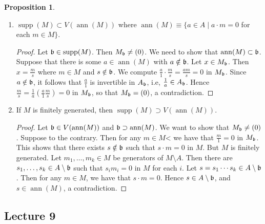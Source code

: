 \documentclass[10pt,letterpaper,cm]{nupset}
\theoremstyle{definition}
\theoremstyle{theorem}
\newtheorem{prop}[definition]{Proposition}
\theoremstyle{remark}
\newcommand{\1}{\mathbf{1}}
\newcommand{\0}{\vec 0}
\DeclareMathOperator{\ann}{ann}
\DeclareMathOperator{\supp}{supp}
\begin{document}
\begin{prop} $ $
\begin{enumerate}
\item $\supp(M) \subset V(\ann(M))$ where $\ann(M) \equiv \{a\in A \mid a\cdot m = 0$ for each $m\in M\}$. 
\begin{proof}
Let $\frak{b} \in \supp(M)$. Then $M_{\frak{b}} \ne (0)$. We need to show that $\ann(M) \subset \frak{b}$.  Suppose that there is some $a\in \ann(M)$ with $a\notin \frak{b}$. Let $x\in M_{\frak{b}}$. Then $x= \frac{m}{s}$ where $m\in M$ and $s\notin \frak{b}$. We compute $\frac{a}{1} \cdot \frac{m}{s} = \frac{am}{s} = 0$ in $M_{\frak{b}}$. Since $a\notin \frak{b}$, it follows that $\frac{a}{1}$ is invertible in $A_{\frak{b}}$, i.e, $\frac{1}{a} \in A_{\frak{b}}$. Hence $\frac{m}{s} = \frac{1}{a}\left(\frac{a}{1}\frac{m}{s}\right) = 0$ in $M_{\frak{b}}$, so that $M_{\frak{b}} = \left(0\right)$, a contradiction.  
\end{proof}
\item If $M$ is finitely generated, then  $\supp(M) \supset V(\ann(M))$.
\begin{proof}
Let $\frak{b} \in V(\ann(M))$ and $\frak{b} \supset \ann(M)$. We want to show that $M_{\frak{b}} \ne (0)$. Suppose to the contrary. Then for any $m\in M$< we have that $\frac{m}{1} =0$ in $M_{\frak{b}}$. This shows that there exists $s\notin \frak{b}$ such that $s\cdot m = 0$ in $M$. But $M$ is finitely generated. Let $m_1, \ldots, m_k \in M$ be generators of $M \setminus A$. Then there are $s_1, \ldots, s_k \in A \setminus \frak{b}$ such that $s_im_i =0$ in $M$ for each $i$. Let $s = s_1 \cdots s_k \in A\setminus \frak{b}$. Then for any $m\in M$, we have that $s\cdot m = 0$. Hence $s\in A \setminus \frak{b}$, and $s\in \ann(M)$, a contradiction. 
\end{proof}
\end{enumerate}
\end{prop}

\subsection{Lecture 9}
\end{document}

